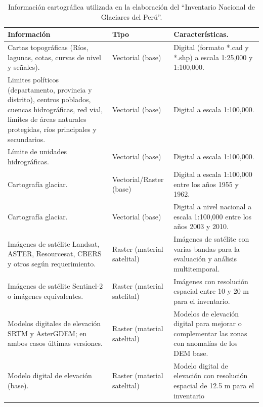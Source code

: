 \begin{table}[H] 
\small
\caption{Información cartográfica utilizada en la elaboración del ``Inventario Nacional de Glaciares del Perú''.\label{tab:RecursosPeru}}
\begin{tabularx}{\textwidth}{Xp{2.8cm}X}
\hline
\textbf{Información} & \textbf{Tipo} & \textbf{Características}.\\ \hline 
Cartas topográficas (Ríos, lagunas, cotas, curvas de nivel y señales). & Vectorial
(base) & Digital (formato
*.cad y *.shp) a
escala 1:25,000 y
1:100,000. \\ \hline 

Limites políticos
(departamento,
provincia y distrito),
centros poblados,
cuencas
hidrográficas, red
vial, límites de áreas
naturales protegidas,
ríos principales y
secundarios. & Vectorial
(base) & Digital a escala
1:100,000. \\ \hline 

Límite de unidades
hidrográficas. & Vectorial
(base) & Digital a escala
1:100,000. \\ \hline 

Cartografía glaciar. & Vectorial/Raster
(base) & Digital a escala
1:100,000 entre los
años 1955 y 1962. \\ \hline

Cartografía glaciar. & Vectorial
(base) & Digital a nivel
nacional a escala
1:100,000 entre los
años 2003 y 2010. \\ \hline

Imágenes de satélite
Landsat, ASTER,
Resourcesat, CBERS y
otros según
requerimiento. & Raster
(material
satelital) & Imágenes de
satélite con varias
bandas para la
evaluación y
análisis
multitemporal. \\ \hline 

Imágenes de satélite
Sentinel-2 o
imágenes
equivalentes. & Raster
(material satelital) & Imágenes con
resolución espacial
entre 10 y 20 m
para el inventario. \\ \hline 

Modelos digitales de
elevación SRTM y
AsterGDEM; en
ambos casos últimas
versiones. & Raster
(material
satelital) & Modelos de
elevación digital
para mejorar o
complementar las
zonas con
anomalías de los
DEM base. \\ \hline

Modelo digital de
elevación (base). & Raster
(material
satelital) & Modelo digital de
elevación con
resolución espacial
de 12.5 m para el
inventario \\ \hline

\end{tabularx}
\end{table}

